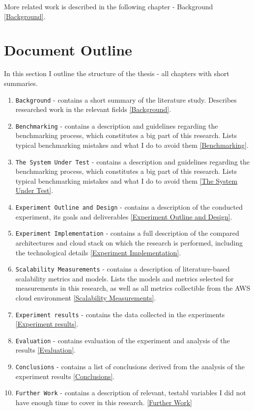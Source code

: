 \documentclass{uvamscse}
\begin{document}
More related work is described in the following chapter - Background \ref{Background}.

\section{Document Outline}
In this section I outline the structure of the thesis - all chapters with short summaries.

\begin{enumerate}
  \item \texttt{Background} - contains a short summary of the literature study. Describes researched work in the relevant fields \ref{Background}.
  \item \texttt{Benchmarking} - contains a description and guidelines regarding the benchmarking process, which constitutes a big part of this research. Lists typical benchmarking mistakes and what I do to avoid them \ref{Benchmarking}.
  \item \texttt{The System Under Test} - contains a description and guidelines regarding the benchmarking process, which constitutes a big part of this research. Lists typical benchmarking mistakes and what I do to avoid them \ref{The System Under Test}.
  \item \texttt{Experiment Outline and Design} - contains a description of the conducted experiment, its goals and deliverables \ref{Experiment Outline and Design}.
  \item \texttt{Experiment Implementation} - contains a full description of the compared architectures and cloud stack on which the research is performed, including the technological details \ref{Experiment Implementation}.
  \item \texttt{Scalability Measurements} - contains a description of literature-based scalability metrics and models. Lists the models and metrics selected for measurements in this research, as well as all metrics collectible from the AWS cloud environment \ref{Scalability Measurements}.
  \item \texttt{Experiment results} - contains the data collected in the experiments \ref{Experiment results}.
  \item \texttt{Evaluation} - contains evaluation of the experiment and analysis of the results \ref{Evaluation}.
  \item \texttt{Conclusions} - contains a list of conclusions derived from the analysis of the experiment results \ref{Conclusions}.
  \item \texttt{Further Work} - contains a description of relevant, testabl variables I did not have enough time to cover in this research. \ref{Further Work}
\end{enumerate}
\end{document}
